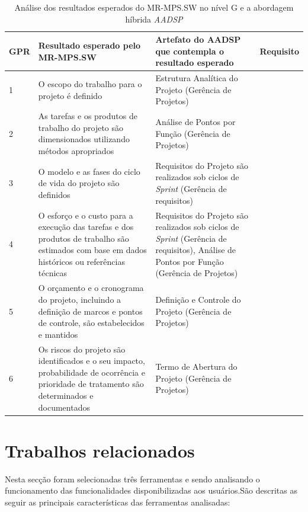 \documentclass{acm_proc_article-sp}
\begin{document}
\begin{table}[h]
\scriptsize
\caption{Análise dos resultados esperados do MR-MPS.SW no nível G e a abordagem híbrida \textit{AADSP} \cite{aadsp:hibirdo}} 
\centering
\begin{tabular}{|p{10mm}|p{60mm}|p{60mm}|p{25mm}|}
\hline
GPR & Resultado esperado pelo MR-MPS.SW & Artefato do AADSP que contempla o resultado esperado & Requisito \\
\hline
1 & O escopo do trabalho para o projeto é definido & Estrutura Analítica do Projeto
(Gerência de Projetos) & \\
2 & As tarefas e os produtos de trabalho do projeto são dimensionados utilizando métodos apropriados & Análise de Pontos por Função (Gerência de Projetos) & \\
3 & O modelo e as fases do ciclo de vida do projeto são definidos & Requisitos do Projeto são realizados sob ciclos de \textit{Sprint} (Gerência de requisitos) &\\
4 &  O esforço e o custo para a execução das tarefas e dos produtos de trabalho são estimados com base em dados históricos ou referências técnicas & Requisitos do Projeto são realizados sob ciclos de \textit{Sprint} (Gerência de requisitos), Análise de Pontos por Função (Gerência de Projetos) & \\
5 & O orçamento e o cronograma do projeto, incluindo a definição de marcos e pontos de controle, são estabelecidos e mantidos
& Definição e Controle do Projeto (Gerência de Projetos) & \\
6 & Os riscos do projeto são identificados e o seu impacto, probabilidade de ocorrência e prioridade de tratamento são
determinados e documentados & Termo de Abertura do Projeto (Gerência de Projetos) & \\
\hline


\hline
\end{tabular}
\end{table}

\section{Trabalhos relacionados}
Nesta secção foram selecionadas três ferramentas e sendo analisando o funcionamento das funcionalidades disponibilizadas aos usuários.São descritas as seguir as principais características das ferramentas analisadas:
\end{document}
